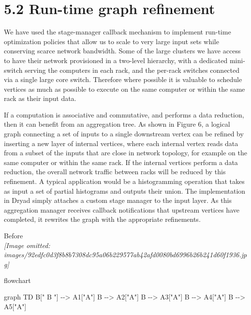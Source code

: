 \documentclass[
]{article}
\newenvironment{Shaded}{}{}
\newcommand{\NormalTok}[1]{#1}
\begin{document}
\section{5.2 Run-time graph refinement}\label{run-time-graph-refinement}

We have used the stage-manager callback mechanism to implement run-time
optimization policies that allow us to scale to very large input sets
while conserving scarce network bandwidth. Some of the large clusters we
have access to have their network provisioned in a two-level hierarchy,
with a dedicated mini-switch serving the computers in each rack, and the
per-rack switches connected via a single large core switch. Therefore
where possible it is valuable to schedule vertices as much as possible
to execute on the same computer or within the same rack as their input
data.

If a computation is associative and commutative, and performs a data
reduction, then it can benefit from an aggregation tree. As shown in
Figure 6, a logical graph connecting a set of inputs to a single
downstream vertex can be refined by inserting a new layer of internal
vertices, where each internal vertex reads data from a subset of the
inputs that are close in network topology, for example on the same
computer or within the same rack. If the internal vertices perform a
data reduction, the overall network traffic between racks will be
reduced by this refinement. A typical application would be a
histogramming operation that takes as input a set of partial histograms
and outputs their union. The implementation in Dryad simply attaches a
custom stage manager to the input layer. As this aggregation manager
receives callback notifications that upstream vertices have completed,
it rewrites the graph with the appropriate refinements.

Before\\
\textit{[Image omitted: images/92edfc0d3f8b8b7308dc95a06b229577ab42afd0080bd6996b26b241d60f1936.jpg]}

flowchart

\begin{Shaded}
\begin{Highlighting}[]
\NormalTok{graph TD}
\NormalTok{    B[" B "] {-}{-}\textgreater{} A1["A"]}
\NormalTok{    B {-}{-}\textgreater{} A2["A"]}
\NormalTok{    B {-}{-}\textgreater{} A3["A"]}
\NormalTok{    B {-}{-}\textgreater{} A4["A"]}
\NormalTok{    B {-}{-}\textgreater{} A5["A"]}
\end{Highlighting}
\end{Shaded}
\end{document}
